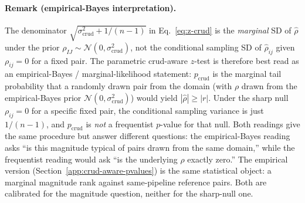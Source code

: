 \paragraph{Remark (empirical-Bayes interpretation).}\label{rem:eb-interpretation}
The denominator $\sqrt{\sigma_{\mathrm{crud}}^2 + 1/(n-1)}$ in Eq.~\eqref{eq:z-crud} is the \emph{marginal} SD of $\hat\rho$ under the prior $\rho_{IJ}\sim\mathcal{N}(0,\sigma_{\mathrm{crud}}^2)$, not the conditional sampling SD of $\hat\rho_{ij}$ given $\rho_{ij}=0$ for a fixed pair. The parametric crud-aware $z$-test is therefore best read as an empirical-Bayes / marginal-likelihood statement: $p_{\mathrm{crud}}$ is the marginal tail probability that a randomly drawn pair from the domain (with $\rho$ drawn from the empirical-Bayes prior $\mathcal{N}(0,\sigma_{\mathrm{crud}}^2)$) would yield $|\hat\rho|\ge|r|$. Under the sharp null $\rho_{ij}=0$ for a specific fixed pair, the conditional sampling variance is just $1/(n-1)$, and $p_{\mathrm{crud}}$ is \emph{not} a frequentist $p$-value for that null. Both readings give the same procedure but answer different questions: the empirical-Bayes reading asks ``is this magnitude typical of pairs drawn from the same domain,'' while the frequentist reading would ask ``is the underlying $\rho$ exactly zero.'' The empirical version (Section~\ref{app:crud-aware-pvalues}) is the same statistical object: a marginal magnitude rank against same-pipeline reference pairs. Both are calibrated for the magnitude question, neither for the sharp-null one.

